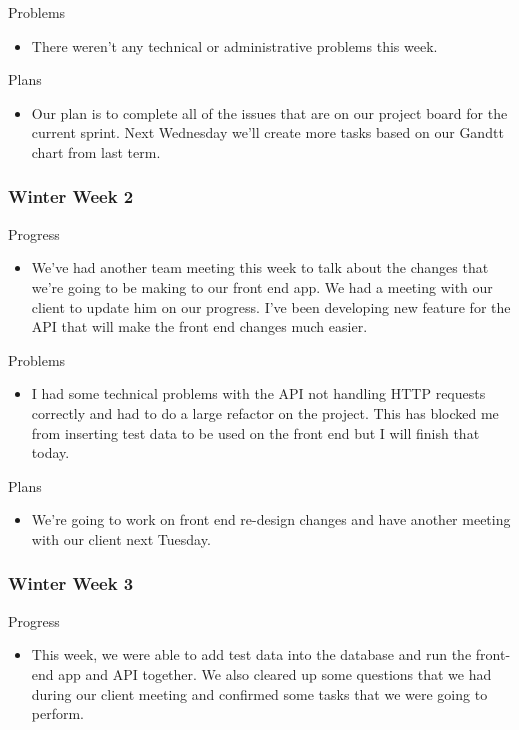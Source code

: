         \noindent
        Problems
        \begin{itemize}
            \item There weren't any technical or administrative problems this week.

        \end{itemize}
        
        \noindent
        Plans
        \begin{itemize}
            \item Our plan is to complete all of the issues that are on our project board for the current sprint. Next Wednesday we'll create more tasks based on our Gandtt chart from last term.
        \end{itemize}
    \subsubsection{Winter Week 2}
        \noindent
        Progress
        \begin{itemize}
            \item We've had another team meeting this week to talk about the changes that we're going to be making to our front end app. We had a meeting with our client to update him on our progress. I've been developing new feature for the API that will make the front end changes much easier.
        \end{itemize}
        
        \noindent
        Problems
        \begin{itemize}
            \item I had some technical problems with the API not handling HTTP requests correctly and had to do a large refactor on the project. This has blocked me from inserting test data to be used on the front end but I will finish that today.
        \end{itemize}
        
        \noindent
        Plans
        \begin{itemize}
            \item We're going to work on front end re-design changes and have another meeting with our client next Tuesday.
        \end{itemize}
    \subsubsection{Winter Week 3}
        \noindent
        Progress
        \begin{itemize}
            \item This week, we were able to add test data into the database and run the front-end app and API together. We also cleared up some questions that we had during our client meeting and confirmed some tasks that we were going to perform.
        \end{itemize}
        
